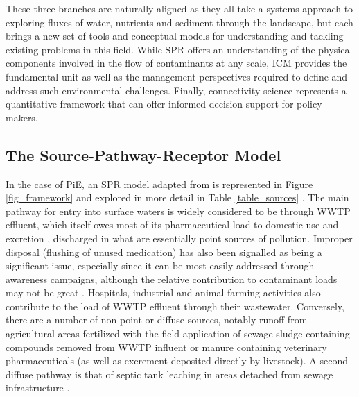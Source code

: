 \documentclass{article}
\begin{document}
These three branches are naturally aligned as they all take a systems approach to exploring fluxes of water, nutrients and sediment through the landscape, but each brings a new set of tools and conceptual models for understanding and tackling existing problems in this field. While SPR offers an understanding of the physical components involved in the flow of contaminants at any scale, ICM provides the fundamental unit as well as the management perspectives required to define and address such environmental challenges. Finally, connectivity science represents a quantitative framework that can offer informed decision support for policy makers.

\subsection{The Source-Pathway-Receptor Model}
In the case of PiE, an SPR model adapted from \citep{Stuart2012ReviewGroundwater} is represented in Figure \ref{fig_framework} and explored in more detail in Table \ref{table_sources} . The main pathway for entry into surface waters is widely considered to be through WWTP effluent, which itself owes most of its pharmaceutical load to domestic use and excretion \citep{Larsson2007EffluentPharmaceuticals}, discharged in what are essentially point sources of pollution. Improper disposal (flushing of unused medication) has also been signalled as being a significant issue, especially since it can be most easily addressed through awareness campaigns, although the relative contribution to contaminant loads may not be great \citep{Vatovec2016InvestigatingSetting}. Hospitals, industrial and animal farming activities also contribute to the load of WWTP effluent through their wastewater. Conversely, there are a number of non-point or diffuse sources, notably runoff from agricultural areas fertilized with the field application of sewage sludge containing compounds removed from WWTP influent or manure containing veterinary pharmaceuticals (as well as excrement deposited directly by livestock). A second diffuse pathway is that of septic tank leaching in areas detached from sewage infrastructure \citep{Comber2018ActiveConcern,Kookana2014PotentialCountries}.
\end{document}
